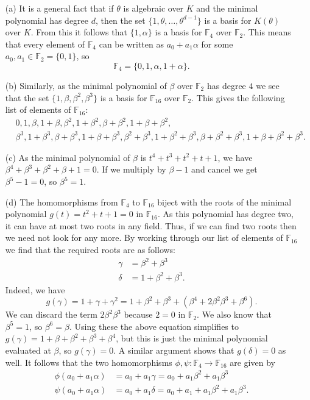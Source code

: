 \documentclass{amsart}
\newcommand{\F}         {{\mathbb{F}}}
\newcommand{\al}        {\alpha}
\newcommand{\bt}        {\beta}
\newcommand{\gm}        {\gamma}
\newcommand{\dl}        {\delta}
\newcommand{\tht}       {\theta}
\renewcommand{\:}{\colon}
\newenvironment{solution}{\SolutionInline}{\endSolutionInline}
\theoremstyle{definition}
\renewenvironment{solution}{\SolutionAtEnd}{\endSolutionAtEnd}
\begin{document}
\begin{solution}
 \begin{itemize}
  \item[(a)] It is a general fact that if $\tht$ is algebraic over $K$
   and the minimal polynomial has degree $d$, then the set
   $\{1,\tht,\dotsc,\tht^{d-1}\}$ is a basis for $K(\tht)$ over $K$.
   From this it follows that $\{1,\al\}$ is a basis for $\F_4$ over
   $\F_2$.  This means that every element of $\F_4$ can be written as
   $a_0+a_1\al$ for some $a_0,a_1\in\F_2=\{0,1\}$, so 
   \[ \F_4 = \{0,1,\al,1+\al\}. \] 
  \item[(b)] Similarly, as the minimal polynomial of $\bt$ over $\F_2$
   has degree $4$ we see that the set $\{1,\bt,\bt^2,\bt^3\}$ is a
   basis for $\F_{16}$ over $\F_2$.  This gives the following list of
   elements of $\F_{16}$:
   \begin{align*}
     & 0,1,\bt,1+\bt,\bt^2,1+\bt^2,\bt+\bt^2,1+\bt+\bt^2, \\
     & \bt^3,1+\bt^3,\bt+\bt^3,1+\bt+\bt^3,\bt^2+\bt^3,
       1+\bt^2+\bt^3,\bt+\bt^2+\bt^3,1+\bt+\bt^2+\bt^3.
   \end{align*}
  \item[(c)] As the minimal polynomial of $\bt$ is $t^4+t^3+t^2+t+1$,
   we have $\bt^4+\bt^3+\bt^2+\bt+1=0$.  If we multiply by $\bt-1$ and
   cancel we get $\bt^5-1=0$, so $\bt^5=1$.
  \item[(d)] The homomorphisms from $\F_4$ to $\F_{16}$ biject with
   the roots of the minimal polynomial $g(t)=t^2+t+1=0$ in $\F_{16}$.
   As this polynomial has degree two, it can have at most two roots in
   any field.  Thus, if we can find two roots then we need not look
   for any more.  By working through our list of elements of $\F_{16}$
   we find that the required roots are as follows:
   \begin{align*}
    \gm &= \bt^2+\bt^3 \\
    \dl &= 1+\bt^2+\bt^3.
   \end{align*}
   Indeed, we have 
   \[ g(\gm) = 1 + \gm + \gm^2 
       = 1 + \bt^2 + \bt^3 + (\bt^4 + 2\bt^2\bt^3 + \bt^6).
   \]
   We can discard the term $2\bt^2\bt^3$ because $2=0$ in $\F_2$.  We
   also know that $\bt^5=1$, so $\bt^6=\bt$.  Using these the above
   equation simplifies to $g(\gm)=1+\bt+\bt^2+\bt^3+\bt^4$, but this
   is just the minimal polynomial evaluated at $\bt$, so $g(\gm)=0$.
   A similar argument shows that $g(\dl)=0$ as well.  It follows that
   the two homomorphisms $\phi,\psi\:\F_4\to\F_{16}$ are given by 
   \begin{align*}
    \phi(a_0+a_1\al) &= a_0 + a_1\gm = a_0 + a_1\bt^2 + a_1\bt^3 \\
    \psi(a_0+a_1\al) &= a_0 + a_1\dl = a_0 + a_1 + a_1\bt^2 + a_1\bt^3.
   \end{align*}
 \end{itemize}
\end{solution}
\end{document}
